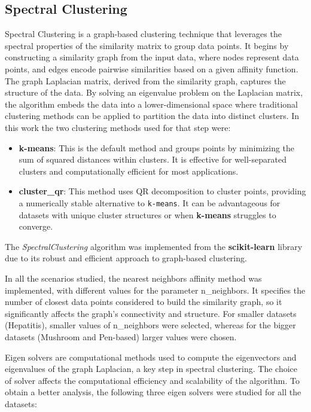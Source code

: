 \subsection{Spectral Clustering}
Spectral Clustering is a graph-based clustering technique that leverages the spectral properties of the similarity matrix
 to group data points. It begins by constructing a similarity graph from the input data, where nodes represent data points,
 and edges encode pairwise similarities based on a given affinity function. The graph Laplacian matrix, derived from the
 similarity graph, captures the structure of the data. By solving an eigenvalue problem on the Laplacian matrix, the
 algorithm embeds the data into a lower-dimensional space where traditional clustering methods can be applied to partition the
  data into distinct clusters. In this work the two clustering methods used for that step were:
  \begin{itemize}
    \item \textbf{k-means}: This is the default method and groups points by minimizing the sum of squared distances within clusters. It is effective for well-separated clusters and computationally efficient for most applications.
    \item \textbf{cluster\_qr}: This method uses QR decomposition to cluster points, providing a numerically stable alternative to 
    \texttt{k-means}. It can be advantageous for datasets with unique cluster structures or when \textbf{k-means} struggles to
     converge.
\end{itemize}


The \textit{SpectralClustering} algorithm was implemented from the \textbf{scikit-learn} library due to its robust and
 efficient approach to graph-based clustering.

In all the scenarios studied, the nearest neighbors affinity method was implemented, with different values for the
parameter n\_neighbors. It specifies the number of closest data points considered to build the similarity graph,
so it significantly affects the graph's connectivity and structure. For smaller datasets (Hepatitis), smaller values of
n\_neighbors were selected, whereas for the bigger datasets (Mushroom and Pen-based) larger values were chosen.

Eigen solvers are computational methods used to compute the eigenvectors and eigenvalues of the graph Laplacian,
a key step in spectral clustering. The choice of solver affects the computational efficiency and scalability of the algorithm.
To obtain a better analysis, the following three eigen solvers were studied for all the datasets:


